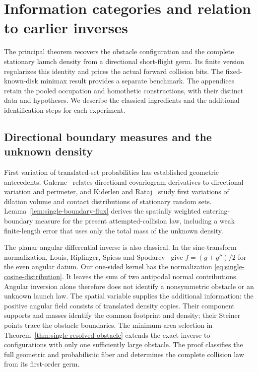 \section{Information categories and relation to earlier inverses}
\label{sec:comparison}
The principal theorem recovers the obstacle configuration and the
complete stationary launch density from a directional short-flight
germ. Its finite version regularizes this identity and prices the
actual forward collision bits. The fixed-known-disk minimax result
provides a separate benchmark. The appendices retain the pooled
occupation and homothetic constructions, with their distinct data and
hypotheses. We describe the classical ingredients and the additional
identification steps for each experiment.

\subsection{Directional boundary measures and the unknown density}
First variation of translated-set probabilities has established
geometric antecedents. Galerne~\cite{Galerne} relates directional
covariogram derivatives to directional variation and perimeter, and
Kiderlen and Rataj~\cite{KiderlenRataj} study first variations of
dilation volume and contact distributions of stationary random sets.
Lemma~\ref{lem:single-boundary-flux} derives the spatially weighted
entering-boundary measure for the present attempted-collision law,
including a weak finite-length error that uses only the total mass
of the unknown density.

The planar angular differential inverse is also classical. In the
sine-transform normalization, Louis, Riplinger, Spiess and
Spodarev~\cite[Section 4]{LRSS} give $f=(g+g'')/2$ for the even
angular datum. Our one-sided kernel has the normalization
\eqref{eq:single-cosine-distribution}. It leaves the sum of two
antipodal normal contributions. Angular inversion alone therefore
does not identify a nonsymmetric obstacle or an unknown launch law.
The spatial variable supplies the additional information: the positive
angular field consists of translated density copies. Their component
supports and masses identify the common footprint and density; their
Steiner points trace the obstacle boundaries. The minimum-area
selection in Theorem~\ref{thm:single-resolved-obstacle} extends the
exact inverse to configurations with only one sufficiently large
obstacle. The proof classifies the full geometric and probabilistic
fiber and determines the complete collision law from its first-order
germ.

